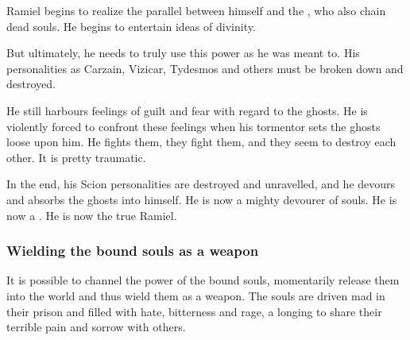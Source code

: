 
Ramiel begins to realize the parallel between himself and the \Sephiroth, who also chain dead souls. He begins to entertain ideas of divinity. 

But ultimately, he needs to truly use this power as he was meant to. 
His personalities as Carzain, Vizicar, Tydesmos and others must be broken down and destroyed. 

He still harbours feelings of guilt and fear with regard to the ghosts. 
He is violently forced to confront these feelings when his tormentor sets the ghosts loose upon him. 
He fights them, they fight them, and they seem to destroy each other. 
It is pretty traumatic. 

In the end, his Scion personalities are destroyed and unravelled, and he devours and absorbs the ghosts into himself. 
He is now a mighty devourer of souls. 
He is now a \Malach. 
He is now the true Ramiel. 






\subsubsection{Wielding the bound souls as a weapon}
It is possible to channel the power of the bound souls, momentarily release them into the world and thus wield them as a weapon. The souls are driven mad in their prison and filled with hate, bitterness and rage, a longing to share their terrible pain and sorrow with others. 

